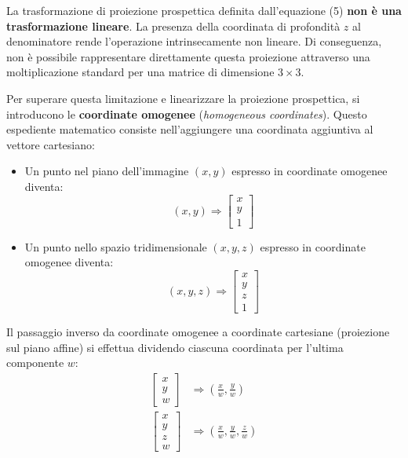 ﻿\documentclass[11pt, a4paper]{article}
\begin{document}
La trasformazione di proiezione prospettica definita dall'equazione (5) \textbf{non è una trasformazione lineare}. La presenza della coordinata di profondità $z$ al denominatore rende l'operazione intrinsecamente non lineare. Di conseguenza, non è possibile rappresentare direttamente questa proiezione attraverso una moltiplicazione standard per una matrice di dimensione $3 \times 3$.

Per superare questa limitazione e linearizzare la proiezione prospettica, si introducono le \textbf{coordinate omogenee} (\emph{homogeneous coordinates}). Questo espediente matematico consiste nell'aggiungere una coordinata aggiuntiva al vettore cartesiano:
\begin{itemize}[noitemsep]
    \item Un punto nel piano dell'immagine $(x, y)$ espresso in coordinate omogenee diventa:
    \[
    (x, y) \Longrightarrow \begin{bmatrix} x \\ y \\ 1 \end{bmatrix}
    \]
    \item Un punto nello spazio tridimensionale $(x, y, z)$ espresso in coordinate omogenee diventa:
    \[
    (x, y, z) \Longrightarrow \begin{bmatrix} x \\ y \\ z \\ 1 \end{bmatrix}
    \]
\end{itemize}

Il passaggio inverso da coordinate omogenee a coordinate cartesiane (proiezione sul piano affine) si effettua dividendo ciascuna coordinata per l'ultima componente $w$:
\begin{align*}
    \begin{bmatrix} x \\ y \\ w \end{bmatrix} &\Longrightarrow \left(\frac{x}{w}, \frac{y}{w}\right) \\
    \begin{bmatrix} x \\ y \\ z \\ w \end{bmatrix} &\Longrightarrow \left(\frac{x}{w}, \frac{y}{w}, \frac{z}{w}\right)
\end{align*}

\newpage
\end{document}
